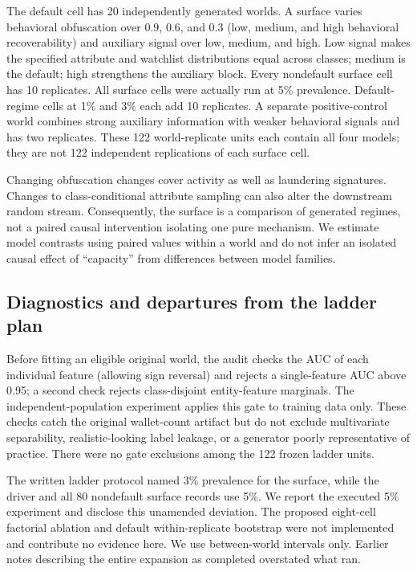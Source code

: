 \documentclass[11pt,a4paper]{article}
\begin{document}
The default cell has 20 independently generated worlds. A surface varies behavioral obfuscation over 0.9, 0.6, and 0.3 (low, medium, and high behavioral recoverability) and auxiliary signal over low, medium, and high. Low signal makes the specified attribute and watchlist distributions equal across classes; medium is the default; high strengthens the auxiliary block. Every nondefault surface cell has 10 replicates. All surface cells were actually run at 5\% prevalence. Default-regime cells at 1\% and 3\% each add 10 replicates. A separate positive-control world combines strong auxiliary information with weaker behavioral signals and has two replicates. These 122 world-replicate units each contain all four models; they are not 122 independent replications of each surface cell.

Changing obfuscation changes cover activity as well as laundering signatures. Changes to class-conditional attribute sampling can also alter the downstream random stream. Consequently, the surface is a comparison of generated regimes, not a paired causal intervention isolating one pure mechanism. We estimate model contrasts using paired values within a world and do not infer an isolated causal effect of ``capacity'' from differences between model families.

\subsection{Diagnostics and departures from the ladder plan}\label{sec:deviations}
Before fitting an eligible original world, the audit checks the AUC of each individual feature (allowing sign reversal) and rejects a single-feature AUC above 0.95; a second check rejects class-disjoint entity-feature marginals. The independent-population experiment applies this gate to training data only. These checks catch the original wallet-count artifact but do not exclude multivariate separability, realistic-looking label leakage, or a generator poorly representative of practice. There were no gate exclusions among the 122 frozen ladder units.

The written ladder protocol named 3\% prevalence for the surface, while the driver and all 80 nondefault surface records use 5\%. We report the executed 5\% experiment and disclose this unamended deviation. The proposed eight-cell factorial ablation and default within-replicate bootstrap were not implemented and contribute no evidence here. We use between-world intervals only. Earlier notes describing the entire expansion as completed overstated what ran.
\end{document}
